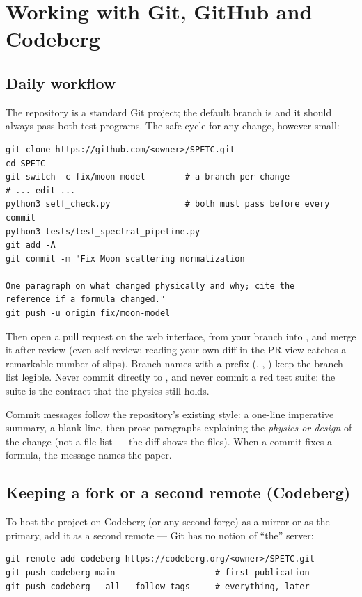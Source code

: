 \section{Working with Git, GitHub and Codeberg}
\label{sec:git}

\subsection{Daily workflow}

The repository is a standard Git project; the default branch is
 and it should always pass both test programs. The safe cycle
for any change, however small:

\begin{verbatim}
git clone https://github.com/<owner>/SPETC.git
cd SPETC
git switch -c fix/moon-model        # a branch per change
# ... edit ...
python3 self_check.py               # both must pass before every commit
python3 tests/test_spectral_pipeline.py
git add -A
git commit -m "Fix Moon scattering normalization

One paragraph on what changed physically and why; cite the
reference if a formula changed."
git push -u origin fix/moon-model
\end{verbatim}

Then open a pull request on the web interface, from your branch into
, and merge it after review (even self-review: reading your
own diff in the PR view catches a remarkable number of slips). Branch
names with a prefix (, , ) keep
the branch list legible. Never commit directly to , and never
commit a red test suite: the suite is the contract that the physics
still holds.

Commit messages follow the repository's existing style: a one-line
imperative summary, a blank line, then prose paragraphs explaining the
\emph{physics or design} of the change (not a file list --- the diff
shows the files). When a commit fixes a formula, the message names the
paper.

\subsection{Keeping a fork or a second remote (Codeberg)}

To host the project on Codeberg (or any second forge) as a mirror or as
the primary, add it as a second remote --- Git has no notion of ``the''
server:

\begin{verbatim}
git remote add codeberg https://codeberg.org/<owner>/SPETC.git
git push codeberg main                    # first publication
git push codeberg --all --follow-tags     # everything, later
\end{verbatim}

